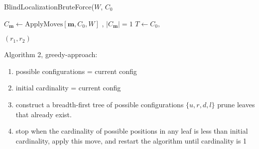 \documentclass[letterpaper, 10 pt, conference]{ieeeconf}
\begin{document}
  \begin{algorithm}
\caption{BlindLocalizationBruteForce($W$, $C_0$}\label{alg:XControl}
\begin{algorithmic}[1]
\Require 
\Ensure  $C_{ \bm{m}} \gets \mathrm{ApplyMoves}[ \bm{m},C_0,W]$ , $|C_{ \bm{m}}| = 1$
\State $T \gets  {C_0, {}}$ 

\State  \Return $(r_1,r_2)$
\end{algorithmic}
\end{algorithm}



%



      
    Algorithm 2, greedy-approach:
      \begin{enumerate}
  \item    possible configurations = current config
    \item      initial cardinality = current config
    \item    construct a breadth-first tree of possible configurations $\{ u,r,d,l\}$ prune leaves that already exist.
    \item    stop when the cardinality of possible positions in any leaf is less than   initial cardinality, apply this move, and restart the algorithm until cardinality is 1 
          \end{enumerate}
    
\end{document}
